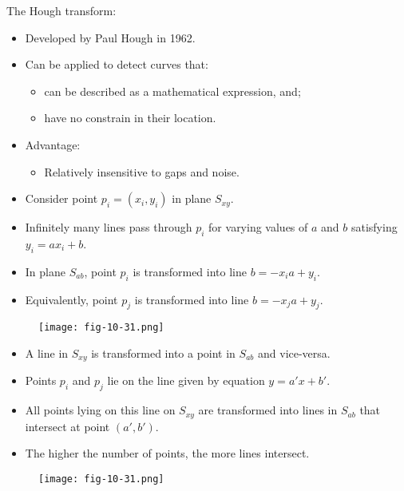 \begin{frame}
The Hough transform:
\begin{itemize}
\item Developed by Paul Hough in 1962.
\item Can be applied to detect curves that:
\begin{itemize}
\item can be described as a mathematical expression, and;
\item have no constrain in their location.
\end{itemize}
\item Advantage:
\begin{itemize}
\item Relatively insensitive to gaps and noise.
\end{itemize}
\end{itemize}
\end{frame}

\begin{frame}
\begin{itemize}
\item Consider point $p_{i} = (x_{i}, y_{i})$ in plane $S_{xy}$.
\item Infinitely many lines pass through $p_{i}$ for varying values of $a$ and $b$ satisfying $y_{i} = ax_{i} + b$.
\item In plane $S_{ab}$, point $p_{i}$ is transformed into line $b = -x_{i}a+y_{i}$.
\item Equivalently, point $p_{j}$ is transformed into line $b = -x_{j}a + y_{j}$.
\end{itemize}
\begin{figure}[!h]
\texttt{[image: fig-10-31.png]}
\end{figure}
\end{frame}

\begin{frame}
\begin{itemize}
\item A line in $S_{xy}$ is transformed into a point in $S_{ab}$ and vice-versa.
\item Points $p_{i}$ and $p_{j}$ lie on the line given by equation $y = a'x + b'$.
\item All points lying on this line on $S_{xy}$ are transformed into lines in $S_{ab}$ that intersect at point $(a', b')$.
\item The higher the number of points, the more lines intersect.
\end{itemize}
\begin{figure}[!h]
\texttt{[image: fig-10-31.png]}
\end{figure}
\end{frame}

